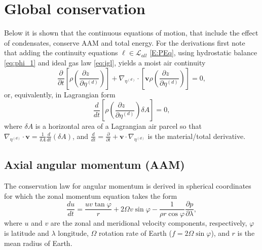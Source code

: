 \documentclass{agujournal}
\begin{document}
{\section{Global conservation}\label{app:conservation}
Below it is shown that the continuous equations of motion, that include the effect of condensates, conserve AAM and total energy. For the derivations first note that adding the continuity equations $\ell \in \mathcal{L}_{all} $ \eqref{E:PEq}, using hydrostatic balance \eqref{eq:phi_1} and ideal gas law \eqref{eq:igl}, yields a moist air continuity
\begin{equation}
\frac{\partial }{\partial t}\left[ \rho \left(\frac{\partial z\quad}{\partial \eta^{(d)}}\right)\right]+\nabla_{\eta^{(d)}} \cdot \left[ \mathbf{v}\rho  \left( \frac{\partial z\quad }{\partial \eta^{(d)}}\right)\right]=0,\label{eq:cont2}
\end{equation}
or, equivalently, in Lagrangian form
\begin{equation}
\frac{d}{dt}\left[ \rho \left( \frac{\partial z\quad }{\partial \eta^{(d)}}\right)\delta A\right]=0,\label{eq:lagra_cont}
\end{equation}
where $\delta A$ is a horizontal area of a Lagrangian air parcel so that $\nabla_{\eta^{(d)}} \cdot \mathbf{v}=\frac{1}{\delta A}\frac{d}{dt}\left( \delta A\right)$, and  $\frac{d}{dt}=\frac{\partial }{\partial t}+\mathbf{v}\cdot \nabla_{\eta^{(d)}} $ is the material/total derivative. 
\subsection{Axial angular momentum (AAM)}
The conservation law for angular momentum is derived in spherical coordinates for which the zonal momentum equation takes the form
\begin{equation}
\frac{du}{dt}=\frac{u v \tan \varphi}{r}+2\Omega v\sin \varphi -\frac{1}{\rho r \cos \varphi}\frac{\partial p}{\partial \lambda},\label{eq:tmp200}
\end{equation}
where $u$ and $v$ are the zonal and meridional velocity components, respectively, $\varphi$ is latitude and $\lambda$ longitude, $\Omega$ rotation rate of Earth ($f=2\Omega \sin \varphi$), and $r$ is the mean radius of Earth.\\

}
\end{document}
